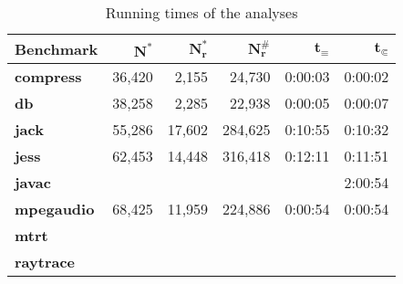 \begin{table}[h]
\caption{Running times of the analyses}\label{tab:runtimes}
\centering
\setlength{\tabcolsep}{2ex}
\begin{tabular}{lrrrrr}
\toprule
\textbf{Benchmark}   & $\bm{N^*}$ & $\bm{N^*_r}$ & $\bm{N^\#_r}$ & $\bm{t_\equiv}$ & $\bm{t_{\Subset}}$ \\ \midrule
\textbf{compress}    & 36,420     & 2,155        & 24,730        & 0:00:03         & 0:00:02            \\
\textbf{db}          & 38,258     & 2,285        & 22,938        & 0:00:05         & 0:00:07            \\
\textbf{jack}        & 55,286     & 17,602       & 284,625       & 0:10:55         & 0:10:32            \\
\textbf{jess}        & 62,453     & 14,448       & 316,418       & 0:12:11         & 0:11:51            \\
\textbf{javac}       &            &              &               &                 & 2:00:54            \\
\textbf{mpegaudio}   & 68,425     & 11,959       & 224,886       & 0:00:54         & 0:00:54            \\
\textbf{mtrt}        &            &              &               &                 &                    \\
\textbf{raytrace}    &            &              &               &                 &                    \\ \bottomrule
\end{tabular}
\end{table}
